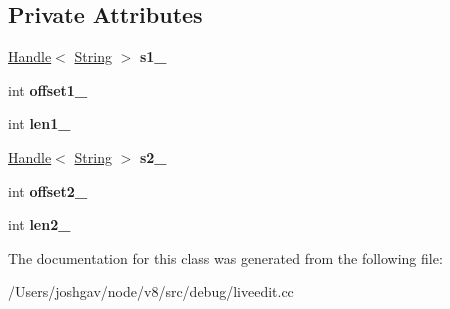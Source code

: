 \subsection*{Private Attributes}
\begin{DoxyCompactItemize}
\item 
\hyperlink{classv8_1_1internal_1_1_handle}{Handle}$<$ \hyperlink{classv8_1_1internal_1_1_string}{String} $>$ {\bfseries s1\+\_\+}\hypertarget{classv8_1_1internal_1_1_tokens_compare_input_aa4b6d2f1521cc12165188a6e66018f28}{}\label{classv8_1_1internal_1_1_tokens_compare_input_aa4b6d2f1521cc12165188a6e66018f28}

\item 
int {\bfseries offset1\+\_\+}\hypertarget{classv8_1_1internal_1_1_tokens_compare_input_ac114cc8c9fcf18a3d04df2a6de0769f2}{}\label{classv8_1_1internal_1_1_tokens_compare_input_ac114cc8c9fcf18a3d04df2a6de0769f2}

\item 
int {\bfseries len1\+\_\+}\hypertarget{classv8_1_1internal_1_1_tokens_compare_input_a29fd6af9e26e43872b353360a85edd6d}{}\label{classv8_1_1internal_1_1_tokens_compare_input_a29fd6af9e26e43872b353360a85edd6d}

\item 
\hyperlink{classv8_1_1internal_1_1_handle}{Handle}$<$ \hyperlink{classv8_1_1internal_1_1_string}{String} $>$ {\bfseries s2\+\_\+}\hypertarget{classv8_1_1internal_1_1_tokens_compare_input_a39b16de1b2dc19683c565dbfd2add5f3}{}\label{classv8_1_1internal_1_1_tokens_compare_input_a39b16de1b2dc19683c565dbfd2add5f3}

\item 
int {\bfseries offset2\+\_\+}\hypertarget{classv8_1_1internal_1_1_tokens_compare_input_a0fd3d27803623ab336022b9a08ac650c}{}\label{classv8_1_1internal_1_1_tokens_compare_input_a0fd3d27803623ab336022b9a08ac650c}

\item 
int {\bfseries len2\+\_\+}\hypertarget{classv8_1_1internal_1_1_tokens_compare_input_a246b47da19f5ee98b3b978182f2a5145}{}\label{classv8_1_1internal_1_1_tokens_compare_input_a246b47da19f5ee98b3b978182f2a5145}

\end{DoxyCompactItemize}


The documentation for this class was generated from the following file\+:\begin{DoxyCompactItemize}
\item 
/\+Users/joshgav/node/v8/src/debug/liveedit.\+cc\end{DoxyCompactItemize}
